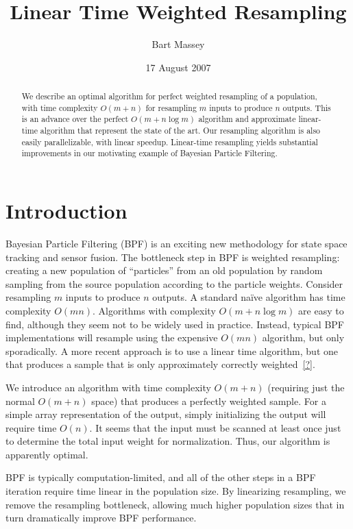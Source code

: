 \documentclass[12pt]{article}
\title{Linear Time Weighted Resampling}
\author{Bart Massey}
\date{17 August 2007}
\begin{document}
  \maketitle

  \begin{abstract}
  We describe an optimal algorithm for perfect weighted resampling
  of a population, with time complexity $O(m + n)$ for
  resampling $m$ inputs to produce $n$ outputs.  This
  is an advance over the perfect $O(m + n \log m)$ algorithm and
  approximate linear-time algorithm that represent the
  state of the art.  Our resampling algorithm is also easily
  parallelizable, with linear speedup.
  Linear-time resampling yields
  substantial improvements in our motivating example of
  Bayesian Particle Filtering.
  \end{abstract}

\section{Introduction}

  Bayesian Particle Filtering (BPF) is an exciting new methodology
  for state space tracking and sensor fusion.  The bottleneck
  step in BPF is weighted resampling: creating a new
  population of ``particles'' from an old population by
  random sampling from the source population according to
  the particle weights.    Consider resampling $m$ inputs to
  produce $n$ outputs.  A standard na\"ive algorithm has time complexity
  $O(mn)$. Algorithms with complexity $O(m + n \log m)$ are easy
  to find, although they seem not to be widely used in
  practice.  Instead, typical BPF implementations will resample
  using the expensive $O(mn)$ algorithm, but only
  sporadically.  A more recent approach is to use a linear
  time algorithm, but one that produces a sample that is
  only approximately correctly weighted~\ref{?}.

  We introduce an algorithm with time complexity $O(m + n)$
  (requiring just the normal $O(m + n)$ space) that produces
  a perfectly weighted sample. For a simple array
  representation of the output, simply initializing the
  output will require time $O(n)$.  It seems that the input
  must be scanned at least once just to determine the total
  input weight for normalization.  Thus, our algorithm is
  apparently optimal.

  BPF is typically computation-limited, and all of the other
  steps in a BPF iteration require time linear in the
  population size.  By linearizing resampling, we remove the
  resampling bottleneck, allowing much higher population
  sizes that in turn dramatically improve BPF performance.
\end{document}
